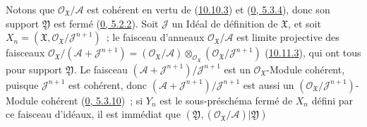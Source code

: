 Notons que $\mathscr{O}_{\mathfrak{X}}/\mathscr{A}$ est cohérent en vertu de
(\hyperref[I.10.10.3-fr]{10.10.3}) et
(\hyperref[0.5.3.4-fr]{0, 5.3.4}), donc son support $\mathfrak{Y}$ est fermé
(\hyperref[0.5.2.2-fr]{0, 5.2.2}). Soit $\mathscr{J}$ un Idéal de définition
de $\mathfrak{X}$, et soit
$X_n=(\mathfrak{X},\mathscr{O}_{\mathfrak{X}}/\mathscr{J}^{n+1})$~; le
faisceau d'anneaux $\mathscr{O}_{\mathfrak{X}}/\mathscr{A}$ est limite
projective des faisceaux
$\mathscr{O}_{\mathfrak{X}}/(\mathscr{A}+\mathscr{J}^{n+1})
=(\mathscr{O}_{\mathfrak{X}}/\mathscr{A})
\otimes_{\mathscr{O}_{\mathfrak{X}}}
(\mathscr{O}_{\mathfrak{X}}/\mathscr{J}^{n+1})$
(\hyperref[I.10.11.3-fr]{10.11.3}), qui ont tous pour support
$\mathfrak{Y}$. Le faisceau
$(\mathscr{A}+\mathscr{J}^{n+1})/\mathscr{J}^{n+1}$ est un
$\mathscr{O}_{\mathfrak{X}}$-Module cohérent, puisque
$\mathscr{J}^{n+1}$ est cohérent, donc
$(\mathscr{A}+\mathscr{J}^{n+1})/\mathscr{J}^{n+1}$ est aussi un
$(\mathscr{O}_{\mathfrak{X}}/\mathscr{J}^{n+1})$-Module cohérent
(\hyperref[0.5.3.10-fr]{0, 5.3.10})~; si $Y_n$ est le sous-préschéma fermé
de $X_n$ défini par ce faisceau d'idéaux, il est immédiat que
$(\mathfrak{Y},(\mathscr{O}_{\mathfrak{X}}/\mathscr{A})|\mathfrak{Y})$

